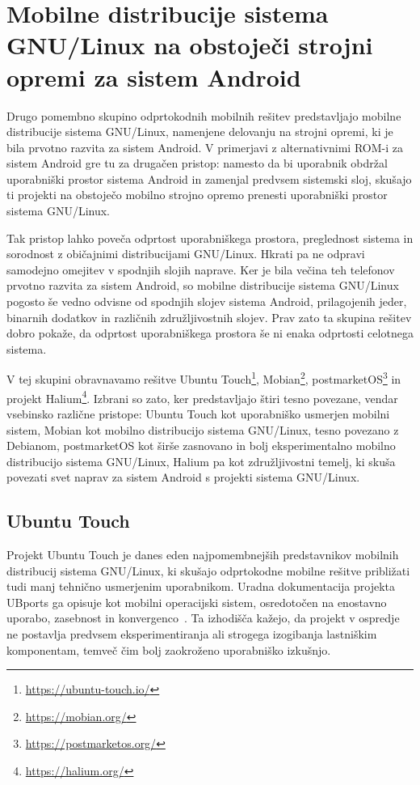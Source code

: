 \documentclass[a4paper,12pt,openright]{book}
\begin{document}
\section{Mobilne distribucije sistema GNU/Linux na obstoječi strojni opremi za sistem Android}
\label{sec:analiza_gnulinux_na_android_strojni_opremi}

Drugo pomembno skupino odprtokodnih mobilnih rešitev predstavljajo mobilne distribucije sistema GNU/Linux, namenjene delovanju na strojni opremi, ki je bila prvotno razvita za sistem Android.
V primerjavi z alternativnimi ROM-i za sistem Android gre tu za drugačen pristop:
namesto da bi uporabnik obdržal uporabniški prostor sistema Android in zamenjal predvsem sistemski sloj, skušajo ti projekti na obstoječo mobilno strojno opremo prenesti uporabniški prostor sistema GNU/Linux.

Tak pristop lahko poveča odprtost uporabniškega prostora, preglednost sistema in sorodnost z običajnimi distribucijami GNU/Linux.
Hkrati pa ne odpravi samodejno omejitev v spodnjih slojih naprave.
Ker je bila večina teh telefonov prvotno razvita za sistem Android, so mobilne distribucije sistema GNU/Linux pogosto še vedno odvisne od spodnjih slojev sistema Android, prilagojenih jeder, binarnih dodatkov in različnih združljivostnih slojev.
Prav zato ta skupina rešitev dobro pokaže, da odprtost uporabniškega prostora še ni enaka odprtosti celotnega sistema.

V tej skupini obravnavamo rešitve Ubuntu Touch\footnote{\url{https://ubuntu-touch.io/}}, Mobian\footnote{\url{https://mobian.org/}}, postmarketOS\footnote{\url{https://postmarketos.org/}} in projekt Halium\footnote{\url{https://halium.org/}}.
Izbrani so zato, ker predstavljajo štiri tesno povezane, vendar vsebinsko različne pristope:
Ubuntu Touch kot uporabniško usmerjen mobilni sistem,
Mobian kot mobilno distribucijo sistema GNU/Linux, tesno povezano z Debianom,
postmarketOS kot širše zasnovano in bolj eksperimentalno mobilno distribucijo sistema GNU/Linux,
Halium pa kot združljivostni temelj, ki skuša povezati svet naprav za sistem Android s projekti sistema GNU/Linux.

\subsection{Ubuntu Touch}

Projekt Ubuntu Touch je danes eden najpomembnejših predstavnikov mobilnih distribucij sistema GNU/Linux, ki skušajo odprtokodne mobilne rešitve približati tudi manj tehnično usmerjenim uporabnikom.
Uradna dokumentacija projekta UBports ga opisuje kot mobilni operacijski sistem, osredotočen na enostavno uporabo, zasebnost in konvergenco~\cite{ubports_ubuntu_touch,ubports_convergence}.
Ta izhodišča kažejo, da projekt v ospredje ne postavlja predvsem eksperimentiranja ali strogega izogibanja lastniškim komponentam, temveč čim bolj zaokroženo uporabniško izkušnjo.
\end{document}
